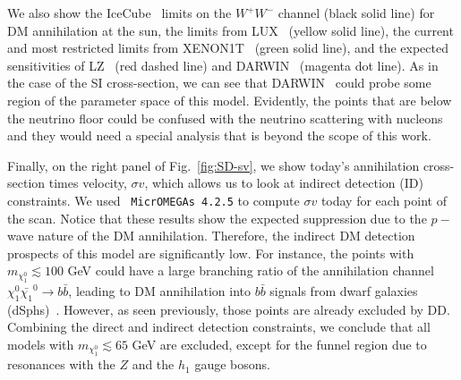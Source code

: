 \documentclass[12pt,letterpaper]{article}
\begin{document}
We also show the IceCube~\cite{2013PhRvL.110m1302A} limits on the $W^+W^{-}$ channel (black solid
line) for DM annihilation at the sun, the limits from LUX~\cite{Akerib:2017kat} (yellow solid line), the current and most restricted limits from XENON1T~\cite{Aprile:2019dbj} (green solid line), and the expected sensitivities of LZ~\cite{Akerib:2018lyp} (red dashed line) and DARWIN~\cite{Aalbers:2016jon} (magenta dot line). As in the case of the SI cross-section, we can see that DARWIN~\cite{Aalbers:2016jon} could probe some region of the parameter space of this model. Evidently, the points that are below the neutrino floor could be confused with the neutrino scattering with nucleons and they would need a special analysis that is beyond the scope of this work.

Finally, on the right panel of Fig.~\ref{fig:SD-sv}, we show today's annihilation cross-section times velocity, $\sigma v$, which allows us to look at indirect detection (ID) constraints. We used ~\texttt{MicrOMEGAs 4.2.5} to compute $\sigma v$ today for each point of the scan. Notice that these results show the expected suppression due to the $p-$wave nature of the DM annihilation. 
Therefore, the  indirect DM detection prospects of this model are significantly low. For instance, the points with $m_{\chi_1^0}\lesssim 100$ GeV could have a large branching ratio of the annihilation channel $\chi_1^0\bar{\chi_1}^0\to b\bar{b}$, leading to DM annihilation into $b\bar{b}$ signals from dwarf galaxies (dSphs)~\cite{Ackermann:2015zua}. However, as seen previously, those points are already excluded by DD. 
Combining the direct and indirect detection constraints, we conclude that all models with $m_{\chi^0_1} \lesssim 65$ GeV are excluded, except for the funnel region due to resonances with the $Z$ and the $h_1$ gauge bosons.
\end{document}
